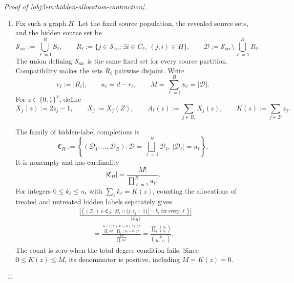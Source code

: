 \documentclass[11pt]{article}
\begin{document}
\begin{proof}[Proof of \cref{obj:lem:hidden-allocation-contraction}]
\begin{enumerate}
Define the response reference measure on \(\mathbb R^B\) by
\[
\nu_{\mathrm{resp}}(dy)
:=
\prod_{\ell=1}^B g_d(y_\ell)\,dy_\ell.
\]
Each \(g_d\) is a probability density, being a finite mixture of translates of the baseline density in \cref{obj:lem:block-law}. Thus
\[
Q_H=\mu_{\mathrm{ass}}\otimes\nu_{\mathrm{resp}}.
\]
Every realized retained graph is compatible with its sampled source partition. Positive graph atoms therefore admit compatible partitions, and they exhaust the graph marginal almost surely. All graphwise constructions below concern these atoms; auxiliary graph functions are extended by zero at null atoms.

\item Fix such a graph \(H\). Let the fixed source population, the revealed source sets, and the hidden source set be
\[
\mathcal S_{\mathrm{src}}:=\bigcup_{\ell=1}^B S_\ell,
\qquad
R_\ell:=\{j\in\mathcal S_{\mathrm{src}}:
\exists i\in C_\ell,\ (j,i)\in H\},
\qquad
\mathcal D:=\mathcal S_{\mathrm{src}}\setminus\bigcup_{\ell=1}^B R_\ell.
\]
The union defining \(\mathcal S_{\mathrm{src}}\) is the same fixed set for every source partition. Compatibility makes the sets \(R_\ell\) pairwise disjoint. Write
\[
r_\ell:=|R_\ell|,
\qquad
u_\ell=d-r_\ell,
\qquad
M=\sum_{\ell=1}^B u_\ell=|\mathcal D|.
\]
For \(z\in\{0,1\}^V\), define
\[
X_j(z):=2z_j-1,
\qquad
X_j:=X_j(Z),
\qquad
A_\ell(z):=\sum_{j\in R_\ell}X_j(z),
\qquad
K(z):=\sum_{j\in\mathcal D}z_j.
\]

The family of hidden-label completions is
\[
\mathfrak C_H
:=
\left\{
(\mathcal D_1,\ldots,\mathcal D_B):
\mathcal D=\bigsqcup_{\ell=1}^B\mathcal D_\ell,\
|\mathcal D_\ell|=u_\ell
\right\}.
\]
It is nonempty and has cardinality
\[
|\mathfrak C_H|=\frac{M!}{\prod_{\ell=1}^B u_\ell!}.
\]
For integers \(0\le k_\ell\le u_\ell\) with
\(\sum_\ell k_\ell=K(z)\), counting the allocations of treated and untreated hidden labels separately gives
\[
\begin{aligned}
&\frac{
\left|
\left\{
(\mathcal D_\ell)\in\mathfrak C_H:
|\mathcal D_\ell\cap\{j:z_j=1\}|=k_\ell
\text{ for every }\ell
\right\}
\right|
}{|\mathfrak C_H|}
\\
&\qquad=
\frac{
\displaystyle
\frac{K(z)!}{\prod_\ell k_\ell!}
\frac{(M-K(z))!}{\prod_\ell(u_\ell-k_\ell)!}
}{
\displaystyle
\frac{M!}{\prod_\ell u_\ell!}
}
=
\frac{\prod_\ell\binom{u_\ell}{k_\ell}}{\binom M{K(z)}}.
\end{aligned}
\]
The count is zero when the total-degree condition fails. Since \(0\le K(z)\le M\), its denominator is positive, including \(M=K(z)=0\).


\end{enumerate}
\end{proof}
\end{document}
